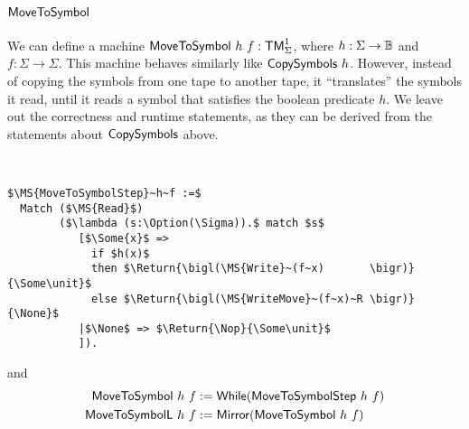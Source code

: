 \section{$\MS{MoveToSymbol}$}
\label{sec:MoveToSymbol}

We can define a machine $\mathsf{MoveToSymbol}~h~f : \mathsf{TM}_\Sigma^1$, where $h:\Sigma\rightarrow\mathbb{B}$ and $f:\Sigma\to\Sigma$.  This machine behaves similarly like
$\mathsf{CopySymbols}~h$.  However, instead of copying the symbols from one tape to another tape, it ``translates'' the symbols it read, until it reads a
symbol that satisfies the boolean predicate $h$.  We leave out the correctness and runtime statements, as they can be derived from the statements
about $\mathsf{CopySymbols}$ above.

\begin{definition}[$\MS{MoveToSymbol}$]
  ~
\begin{lstlisting}[style=semicoqstyle]
$\MS{MoveToSymbolStep}~h~f :=$
  Match ($\MS{Read}$)
        ($\lambda (s:\Option(\Sigma)).$ match $s$
           [$\Some{x}$ => 
             if $h(x)$
             then $\Return{\bigl(\MS{Write}~(f~x)       \bigr)}{\Some\unit}$ 
             else $\Return{\bigl(\MS{WriteMove}~(f~x)~R \bigr)}{\None}$ 
           |$\None$ => $\Return{\Nop}{\Some\unit}$ 
           ]).
\end{lstlisting}
  and
  \begin{align*}
    \mathsf{MoveToSymbol }~h~f &:= \mathsf{While}(\mathsf{MoveToSymbolStep}~h~f) \\
    \mathsf{MoveToSymbolL}~h~f &:= \mathsf{Mirror}(\mathsf{MoveToSymbol}~h~f)
  \end{align*}
\end{definition}



